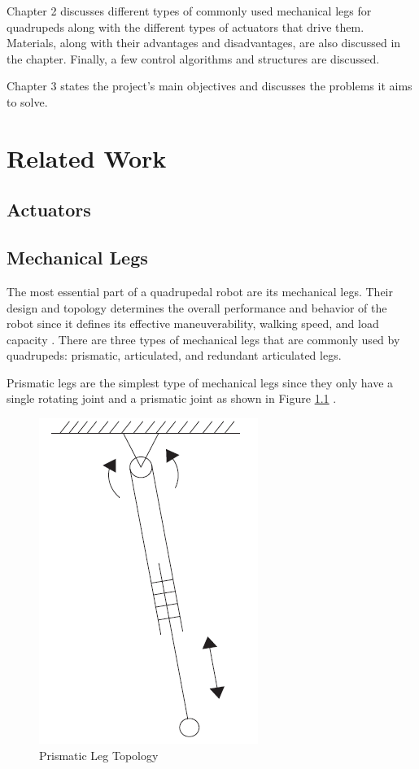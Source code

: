 \documentclass[english]{upeeei}
\begin{document}
Chapter 2 discusses different types of commonly used mechanical legs for quadrupeds along with the different types of actuators that drive them. Materials, along with their advantages and disadvantages, are also discussed in the chapter. Finally, a few control algorithms and structures are discussed.

Chapter 3 states the project's main objectives and discusses the problems it aims to solve.

\cleardoublepage{}

\chapter{Related Work\label{cha:RRW}}

\section{Actuators}

\section{Mechanical Legs}

The most essential part of a quadrupedal robot are its mechanical legs. Their design and topology determines the overall performance and behavior of the robot since it defines its effective maneuverability, walking speed, and load capacity \cite{designprinciples}. There are three types of mechanical legs that are commonly used by quadrupeds: prismatic, articulated, and redundant articulated legs. 

Prismatic legs are the simplest type of mechanical legs since they only have a single rotating joint and a prismatic joint as shown in Figure \ref{fig:prismatic-leg} \cite{quadrobotlegs}. 

\begin{figure}[H]
\begin{centering}
\includegraphics[width=0.3\columnwidth]{images/prismatic_leg}
\par\end{centering}
\caption{Prismatic Leg Topology\label{fig:prismatic-leg}}
\end{figure}
\end{document}
